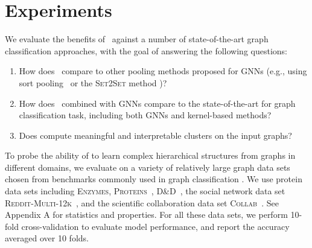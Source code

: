 \section{Experiments}
\label{sec:ex}

We evaluate the benefits of \name\ against a number of state-of-the-art graph classification approaches, with the goal of answering the following questions:
\begin{enumerate}[leftmargin=20pt]
\item[{\bf Q1}] How does  \name\ compare to other pooling methods proposed for GNNs (e.g., using sort pooling~\cite{zhang2018end} or the \textsc{Set2Set} method \cite{Gil+2017})?
\item[{\bf Q2}] How does  \name\ combined with GNNs compare to the state-of-the-art for graph classification task, including both GNNs and kernel-based methods?
\item[{\bf Q3}] Does  \name  compute meaningful and interpretable clusters on the input graphs?
\end{enumerate}


To probe the ability of \name to learn complex hierarchical structures from graphs in different domains, we evaluate on a variety of relatively large graph data sets chosen from benchmarks commonly used in graph classification \cite{KKMMN2016}. We use protein data sets including \textsc{Enzymes}, \textsc{Proteins}~\cite{Borgwardt2005a, Fer+2013}, \textsc{D\&D}~\cite{Dob+2003}, the social network data set \textsc{Reddit-Multi-12k}~\cite{Yan+2015a}, and the scientific collaboration data set \textsc{Collab}~\cite{Yan+2015a}. See Appendix A for statistics and properties.
For all these data sets, we perform 10-fold cross-validation to evaluate model performance, and report the accuracy averaged over 10 folds. 
 

